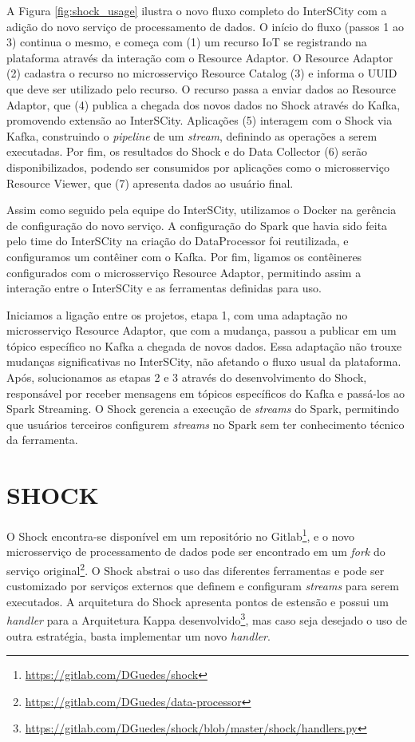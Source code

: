 A Figura \ref{fig:shock_usage} ilustra o novo fluxo completo do InterSCity com a
adição do novo serviço de processamento de dados. O início do fluxo (passos 1 ao
3) continua o mesmo, e começa com (1) um recurso IoT se registrando na plataforma
através da interação com o Resource Adaptor. O Resource Adaptor (2) cadastra o
recurso no microsserviço Resource Catalog (3) e informa o UUID que deve ser
utilizado pelo recurso. O recurso passa a enviar dados ao Resource Adaptor, que
(4) publica a chegada dos novos dados no Shock através do Kafka, promovendo
extensão ao InterSCity.  Aplicações (5) interagem com o Shock via Kafka,
construindo o \textit{pipeline} de um \textit{stream}, definindo as operações a
serem executadas.  Por fim, os resultados do Shock e do Data Collector (6)
serão disponibilizados, podendo ser consumidos por aplicações como o
microsserviço Resource Viewer, que (7) apresenta dados ao usuário final.

Assim como seguido pela equipe do InterSCity, utilizamos o Docker na gerência de
configuração do novo serviço. A configuração do Spark que havia sido feita pelo
time do InterSCity na criação do DataProcessor foi reutilizada, e configuramos
um contêiner com o Kafka. Por fim, ligamos os contêineres configurados com o
microsserviço Resource Adaptor, permitindo assim a interação entre o InterSCity
e as ferramentas definidas para uso.

Iniciamos a ligação entre os projetos, etapa 1, com uma adaptação no
microsserviço Resource Adaptor, que com a mudança, passou a publicar em um tópico
específico no Kafka a chegada de novos dados. Essa adaptação não trouxe mudanças
significativas no InterSCity, não afetando o fluxo usual da plataforma.
Após, solucionamos as etapas 2 e 3 através do desenvolvimento do Shock,
responsável por receber mensagens em tópicos específicos do Kafka e passá-los
ao Spark Streaming. O Shock gerencia a execução de \textit{streams} do Spark,
permitindo que usuários terceiros configurem \textit{streams} no Spark sem ter
conhecimento técnico da ferramenta.

\section{SHOCK}

O Shock encontra-se disponível em um repositório no
Gitlab\footnote{\url{https://gitlab.com/DGuedes/shock}}, e o novo microsserviço
de processamento de dados pode ser encontrado em um \textit{fork} do serviço
original\footnote{\url{https://gitlab.com/DGuedes/data-processor}}. O Shock
abstrai o uso das diferentes ferramentas e pode ser customizado
por serviços externos que definem e configuram \textit{streams} para serem
executados. A arquitetura do Shock apresenta pontos de estensão e possui
um \textit{handler} para a Arquitetura Kappa
desenvolvido\footnote{\url{https://gitlab.com/DGuedes/shock/blob/master/shock/handlers.py}},
mas caso seja desejado o uso de outra estratégia, basta implementar um novo
\textit{handler}.

